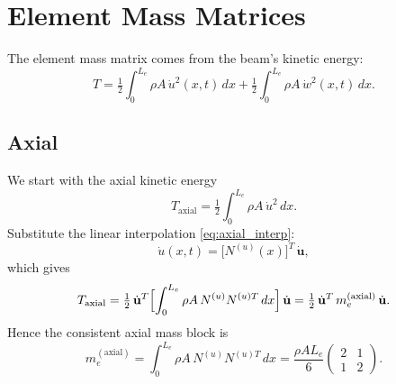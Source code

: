 \documentclass{article}
\begin{document}
	\section{Element Mass Matrices}
	The element mass matrix comes from the beam’s kinetic energy:
	\begin{equation}
		T
		= \tfrac12\int_0^{L_e}\rho A\,\dot u^2(x,t)\,dx
		+\tfrac12\int_0^{L_e}\rho A\,\dot w^2(x,t)\,dx.
	\end{equation}
	
	\subsection{Axial}
	We start with the axial kinetic energy
	\begin{equation}
		T_{\mathrm{axial}}
		= \tfrac12\int_0^{L_e}\rho A\,\dot u^2\,dx.
	\end{equation}
	Substitute the linear interpolation \eqref{eq:axial_interp}:
	\begin{equation}
		\dot u(x,t)
		= \bigl[N^{(u)}(x)\bigr]^T\,\dot{\mathbf{u}},
	\end{equation}
	which gives
	\begin{equation}
		T_{\mathrm{axial}}
		= \tfrac12\,\dot{\mathbf{u}}^T
		\Bigl[\int_0^{L_e}\rho A\,N^{(u)}N^{(u)T}\,dx\Bigr]
		\,\dot{\mathbf{u}}
		= \tfrac12\,\dot{\mathbf{u}}^T\,m_e^{(\mathrm{axial})}\,\dot{\mathbf{u}}.
	\end{equation}
	Hence the consistent axial mass block is
	\begin{equation}\label{eq:me_axial}
		m_e^{(\mathrm{axial})}
		= \int_0^{L_e}\rho A\,N^{(u)}N^{(u)T}\,dx
		= \frac{\rho A L_e}{6}
		\begin{pmatrix}2 & 1\\ 1 & 2\end{pmatrix}.
	\end{equation}
	
\end{document}
